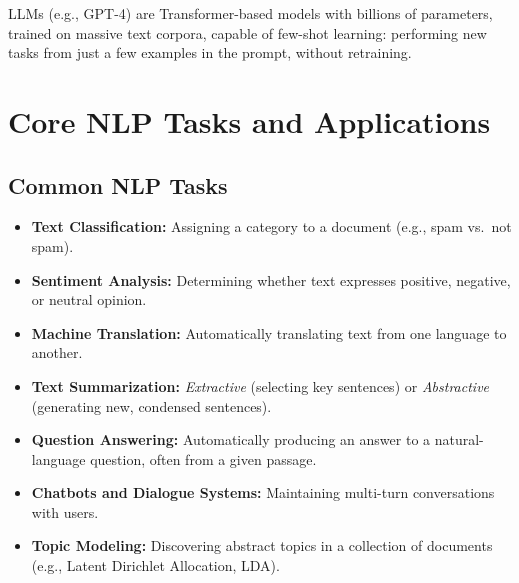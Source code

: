 \documentclass[11pt,a4paper]{article}
\begin{document}
\begin{conceptbox}
LLMs (e.g., GPT-4) are Transformer-based models with billions of parameters, trained on massive text corpora, capable of few-shot learning: performing new tasks from just a few examples in the prompt, without retraining.
\end{conceptbox}

\section{Core NLP Tasks and Applications}

\subsection{Common NLP Tasks}
\begin{itemize}[leftmargin=*]
  \item \textbf{Text Classification:} Assigning a category to a document (e.g., spam vs.\ not spam).
  \item \textbf{Sentiment Analysis:} Determining whether text expresses positive, negative, or neutral opinion.
  \item \textbf{Machine Translation:} Automatically translating text from one language to another.
  \item \textbf{Text Summarization:} \textit{Extractive} (selecting key sentences) or \textit{Abstractive} (generating new, condensed sentences).
  \item \textbf{Question Answering:} Automatically producing an answer to a natural-language question, often from a given passage.
  \item \textbf{Chatbots and Dialogue Systems:} Maintaining multi-turn conversations with users.
  \item \textbf{Topic Modeling:} Discovering abstract topics in a collection of documents (e.g., Latent Dirichlet Allocation, LDA).
\end{itemize}
\end{document}
